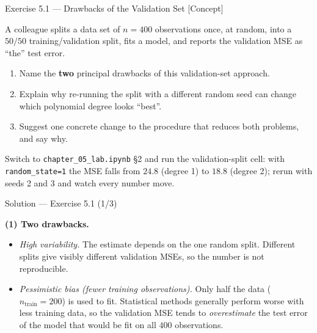 \documentclass[aspectratio=169,11pt]{beamer}
\begin{document}
\begin{frame}{Exercise 5.1 --- Drawbacks of the Validation Set [Concept]}
  \begin{exercise}
    A colleague splits a data set of $n = 400$ observations once, at
    random, into a $50/50$ training/validation split, fits a model, and
    reports the validation MSE as ``the'' test error.
    \begin{enumerate}
      \item Name the \textbf{two} principal drawbacks of this
            validation-set approach.
      \item Explain why re-running the split with a different random seed
            can change which polynomial degree looks ``best''.
      \item Suggest one concrete change to the procedure that reduces
            both problems, and say why.
    \end{enumerate}
  \end{exercise}
  \begin{labnote}
    Switch to \texttt{chapter\_05\_lab.ipynb} \S2 and run the validation-split
    cell: with \texttt{random\_state=1} the MSE falls from $24.8$ (degree 1) to
    $18.8$ (degree 2); rerun with seeds 2 and 3 and watch every number move.
  \end{labnote}
\end{frame}

\begin{frame}{Solution --- Exercise 5.1 (1/3)}
  \begin{solutionbox}
    \textbf{(1) Two drawbacks.}
    \begin{itemize}
      \item \emph{High variability.} The estimate depends on the one
            random split. Different splits give visibly different
            validation MSEs, so the number is not reproducible.
      \item \emph{Pessimistic bias (fewer training observations).} Only
            half the data ($n_\mathrm{train} = 200$) is used to fit.
            Statistical methods generally perform worse with less
            training data, so the validation MSE tends to
            \emph{overestimate} the test error of the model that would
            be fit on all $400$ observations.
    \end{itemize}
  \end{solutionbox}
\end{frame}
\end{document}

